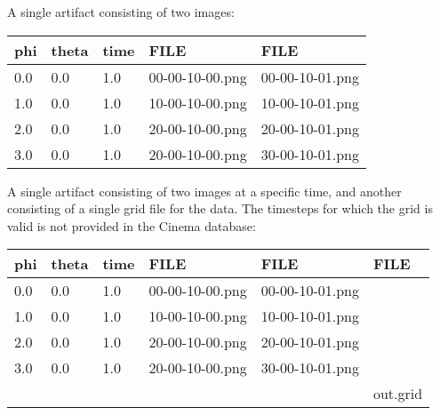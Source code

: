 \documentclass{article}
\begin{document}
A single artifact consisting of two images:
\begin{center}
\begin{tabular}{l|l|l|l|l}
phi & theta & time & FILE & FILE \\
\hline
0.0 & 0.0 & 1.0 & 00-00-10-00.png & 00-00-10-01.png\\
1.0 & 0.0 & 1.0 & 10-00-10-00.png & 10-00-10-01.png\\
2.0 & 0.0 & 1.0 & 20-00-10-00.png & 20-00-10-01.png\\
3.0 & 0.0 & 1.0 & 20-00-10-00.png & 30-00-10-01.png\\
\end{tabular}
\end{center}

A single artifact consisting of two images at a specific time, and another
consisting of a single grid file for the data. The timesteps for which the grid
is valid is not provided in the Cinema database:
\begin{center}
\begin{tabular}{l|l|l|l|l|l}
phi & theta & time & FILE & FILE & FILE\\
\hline
0.0 & 0.0 & 1.0 & 00-00-10-00.png & 00-00-10-01.png & \\
1.0 & 0.0 & 1.0 & 10-00-10-00.png & 10-00-10-01.png & \\
2.0 & 0.0 & 1.0 & 20-00-10-00.png & 20-00-10-01.png & \\
3.0 & 0.0 & 1.0 & 20-00-10-00.png & 30-00-10-01.png & \\
 &  &  & & & out.grid\\
\end{tabular}
\end{center}

\end{document}
